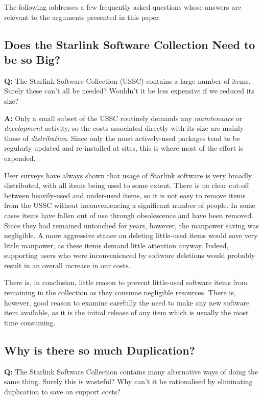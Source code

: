 \documentclass[twoside,11pt]{article}
\newcommand{\htmlref}[2]{#1}
\newcommand{\xref}[3]{#1}
\newcommand{\st}[1]{{\em{#1}}}
\newcommand{\dev}[1]{\htmlref{#1}{development}}
\newcommand{\dis}[1]{\htmlref{#1}{distribution}}
\newcommand{\mnt}[1]{\htmlref{#1}{maintenance}}
\newcommand{\usscref}[1]{\xref{#1}{sun1}{}}
\begin{document}
The following addresses a few frequently asked questions whose answers
are relevant to the arguments presented in this paper.

\subsection{\label{USSC}Does the Starlink Software Collection Need to
be so Big?}

{\Large \bf Q:} The \usscref{Starlink Software Collection} (USSC)
contains a large number of items. Surely these can't all be needed?
Wouldn't it be less expensive if we reduced its size?

{\Large \bf A:} Only a small subset of the USSC routinely demands
any \st{\mnt{maintenance}} or \st{\dev{development}} activity, so the costs associated
directly with its size are mainly those of \st{\dis{distribution}}. Since only
the most actively-used packages tend to be regularly updated and
re-installed at sites, this is where most of the effort is expended.

User surveys have always shown that usage of Starlink software is very
broadly distributed, with all items being used to some extent. There
is no clear cut-off between heavily-used and under-used items, so it
is not easy to remove items from the USSC without inconveniencing a
significant number of people. In some cases items have fallen out of
use through obsolescence and have been removed.  Since they had
remained untouched for years, however, the manpower saving was
negligible.  A more aggressive stance on deleting little-used items
would save very little manpower, as these items demand little
attention anyway. Indeed, supporting users who were inconvenienced by
software deletions would probably result in an overall increase in our
costs.

There is, in conclusion, little reason to prevent little-used software
items from remaining in the collection as they consume negligible
resources. There is, however, good reason to examine carefully the
need to make any new software item available, as it is the initial
release of any item which is usually the most time consuming.

\subsection{\label{duplication}Why is there so much Duplication?}

{\Large \bf Q:} The \usscref{Starlink Software Collection} contains
many alternative ways of doing the same thing. Surely this is
wasteful? Why can't it be rationalised by eliminating duplication to
save on support costs?
\end{document}
